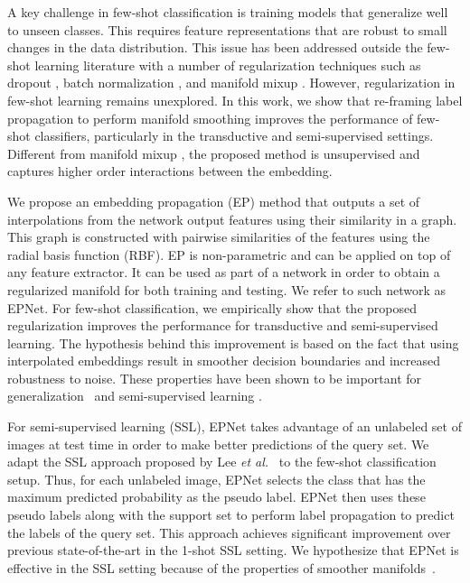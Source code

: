 \documentclass[runningheads]{llncs}
\begin{document}
A key challenge in few-shot classification is training models that generalize well to unseen classes. This requires feature representations that are robust to small changes in the data distribution. This issue has been addressed outside the few-shot learning literature with a number of regularization techniques such as dropout \cite{srivastava2014dropout}, batch normalization \cite{ioffe2015batch}, and manifold mixup \cite{verma2019manifold}. However, regularization in few-shot learning remains unexplored. In this work, we show that re-framing label propagation to perform manifold smoothing improves the performance of few-shot classifiers, particularly in the transductive and semi-supervised settings. Different from manifold mixup \cite{verma2019manifold}, the proposed method is unsupervised and captures higher order interactions between the embedding.

We propose an embedding propagation (EP) method that outputs a set of interpolations from the network output features using their similarity in a graph. This graph is constructed with pairwise similarities of the features using the radial basis function (RBF). EP is non-parametric and can be applied on top of any feature extractor. It can be used as part of a network in order to obtain a regularized manifold for both training and testing. We refer to such network as EPNet. For few-shot classification, we empirically show that the proposed regularization improves the performance for transductive and semi-supervised learning. The hypothesis behind this improvement is based on the fact that using interpolated embeddings result in smoother decision boundaries and increased robustness to noise. These properties have been shown to be important for generalization~\cite{bartlett1999generalization,lee1995lower,verma2019manifold} and semi-supervised learning \cite{chapelle2005semi}.


For semi-supervised learning (SSL), EPNet takes advantage of an unlabeled set of images at test time in order to make better predictions of the query set. We adapt the SSL approach proposed by Lee \emph{et al.}~\cite{lee2013pseudo} to the few-shot classification setup. Thus, for each unlabeled image, EPNet selects the class that has the maximum predicted probability as the pseudo label. EPNet then uses these pseudo labels along with the support set to perform label propagation to predict the labels of the query set. This approach achieves significant improvement over previous state-of-the-art in the 1-shot SSL setting. We hypothesize that EPNet is effective in the SSL setting because of the properties of smoother manifolds~\cite{chapelle2005semi}. 
\end{document}
